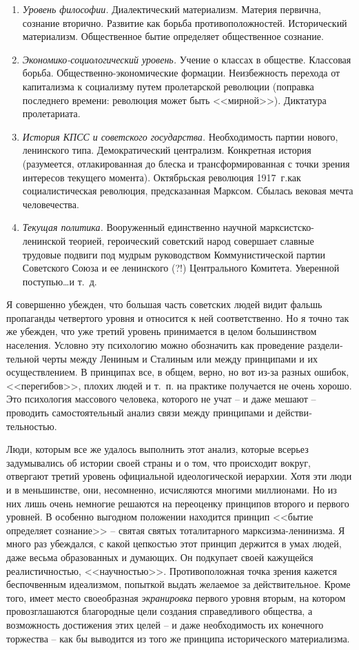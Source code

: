 \documentclass{book}
\begin{document}
\begin{enumerate}
 \item \textit{Уровень философии.}  Диалектический материализм. Материя первична, сознание вторично. Развитие как борьба 
 противоположностей. Исторический материализм. Общественное бытие определяет общественное сознание.
 \item \textit{Экономико-социологический уровень.}  Учение о классах в обществе. Классовая борьба. Общественно-экономические 
 формации. Неизбежность перехода от капитализма к социализму путем пролетарской революции (поправка последнего времени: 
 революция может быть <<мирной>>). Диктатура пролетариата.
 \item \textit{История КПСС и советского государства.} Необходимость партии нового, ленинского типа. Демократический централизм. 
 Конкретная история (разумеется, отлакированная до блеска и трансформированная с точки зрения интересов текущего момента). 
 Октябрьская революция 1917~г.как социалистиче­ская революция, предсказанная Марксом. Сбылась вековая мечта человечества.
 \item \textit{Текущая политика.}  Вооруженный единственно научной марксистско-ленинской теорией, героический советский народ 
 совершает славные трудовые подвиги под мудрым руководством Коммунистической партии Советского Союза и ее ленинского (?!) 
 Центрального Комитета. Уверенной поступью\ldots и т.~д.
\end{enumerate}

Я совершенно убежден, что большая часть советских людей видит фальшь пропаганды четвертого уровня и относится к ней 
соответственно. Но я точно так же убежден, что уже третий уровень принимается в целом большинством населения. Услов­но эту 
психологию можно обозначить как проведение раздели­тельной черты между Лениным и Сталиным или между прин­ципами и их 
осуществлением. В принципах все, в общем, верно, но вот из-за разных ошибок, <<перегибов>>, плохих людей и т.~п. на практике 
получается не очень хорошо. Это психология массо­вого человека, которого не учат -- и даже мешают -- проводить самостоятельный 
анализ связи между принципами и действи­тельностью.

Люди, которым все же удалось выполнить этот анализ, кото­рые всерьез задумывались об истории своей страны и о том, что происходит 
вокруг, отвергают третий уровень официальной идеологической иерархии. Хотя эти люди и в меньшинстве, они, несомненно, 
исчисляются многими миллионами. Но из них лишь очень немногие решаются на переоценку принципов второго и первого уровней. В 
особенно выгодном положении находится принцип <<бытие определяет сознание>> -- святая свя­тых тоталитарного марксизма-ленинизма. 
Я много раз убеж­дался, с какой цепкостью этот принцип держится в умах лю­дей, даже весьма образованных и думающих. Он подкупает 
своей кажущейся реалистичностью, <<научностью>>. Противопо­ложная точка зрения кажется беспочвенным идеализмом, по­пыткой выдать 
желаемое за действительное. Кроме того, имеет место своеобразная \textit{экранировка}  первого уровня вторым, на котором
провозглашаются благородные цели создания справедливого общества, а возможность достижения этих целей -- и даже необходимость их
конечного торжества -- как бы вы­водится из того же принципа исторического материализма.
\end{document}

